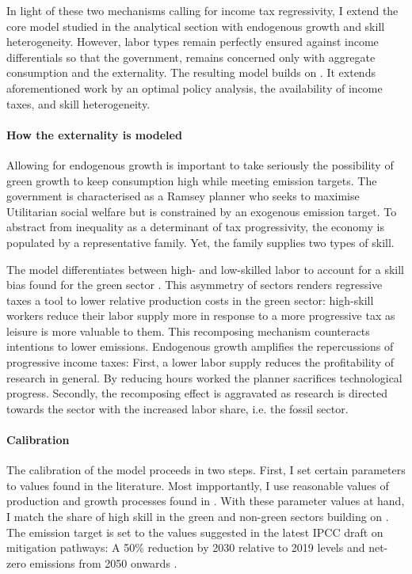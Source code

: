 In light of these two mechanisms calling for income tax regressivity, I extend the core model studied in the analytical section with endogenous growth and skill heterogeneity. However, labor types remain perfectly ensured against income differentials so that the government, remains concerned only with aggregate consumption and the externality. 
The resulting model builds on \cite{Fried2018ClimateAnalysis}. It extends aforementioned work by an optimal policy analysis, the availability of income taxes, and skill heterogeneity. 

\paragraph{How the externality is modeled}
Allowing for endogenous growth is important to take seriously the possibility of green growth to keep consumption high while meeting emission targets.
The government is characterised as a Ramsey planner who seeks to maximise Utilitarian social welfare but is constrained by an exogenous emission target. To abstract from inequality as a determinant of tax progressivity, the economy is populated by a representative family. Yet, the family supplies two types of skill. 

The model differentiates between high- and low-skilled labor to account for a skill bias found for the green sector \citep{Consoli2016DoCapital}. This asymmetry of sectors renders regressive taxes a tool to lower relative production costs in the green sector: high-skill workers reduce their labor supply more in response to a more progressive tax as leisure is more valuable to them. This recomposing mechanism counteracts intentions to lower emissions. %
Endogenous growth amplifies the repercussions of progressive income taxes:
First, a lower labor supply reduces the profitability of research in general. By reducing hours worked the planner sacrifices technological progress. Secondly, the recomposing effect is aggravated as research is directed towards the sector with the increased labor share, i.e. the fossil sector.

\paragraph{Calibration}
The calibration of the model proceeds in two steps. First, I set certain parameters to values found in the literature. Most impportantly, I use reasonable values of production and growth processes found in \cite{Fried2018ClimateAnalysis}. %
With these parameter values at hand, I match the share of high skill in the green and non-green sectors building on \cite{Consoli2016DoCapital}. The emission target is set to the values suggested in the latest IPCC draft on mitigation pathways: A 50\% reduction by 2030 relative to 2019 levels and  net-zero emissions from 2050 onwards \citep{IPCC2022}.

